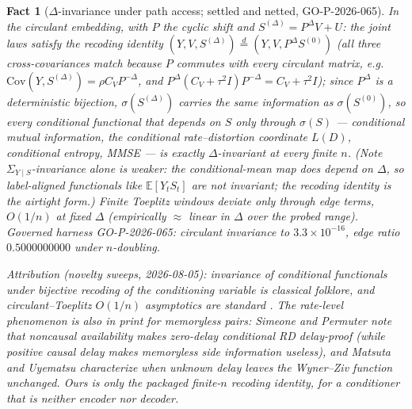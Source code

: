 ﻿\documentclass[11pt]{article}
\newtheorem{fact}{Fact}
\theoremstyle{remark}
\begin{document}
\begin{fact}[$\Delta$-invariance under path access; settled and netted,
GO-P-2026-065]\label{lem:recoding}
In the circulant embedding, with $P$ the cyclic shift and
$S^{(\Delta)}=P^\Delta V+U$: the joint laws satisfy the \emph{recoding
identity} $(Y,V,S^{(\Delta)})\overset d=(Y,V,P^\Delta S^{(0)})$
(all three cross-covariances match because $P$ commutes with every
circulant matrix, e.g.\ $\mathrm{Cov}(Y,S^{(\Delta)})=\rho C_VP^{-\Delta}$,
and $P^\Delta(C_V+\tau^2I)P^{-\Delta}=C_V+\tau^2I$); since $P^\Delta$ is
a deterministic bijection, $\sigma(S^{(\Delta)})$ carries the same
information as $\sigma(S^{(0)})$, so \emph{every conditional functional
that depends on $S$ only through $\sigma(S)$} --- conditional mutual
information, the conditional rate--distortion coordinate $L(D)$,
conditional entropy, MMSE --- is exactly $\Delta$-invariant at every
finite $n$. (Note $\Sigma_{Y\mid S}$-invariance alone is weaker: the
conditional-mean \emph{map} does depend on $\Delta$, so label-aligned
functionals like $\mathbb E[Y_tS_t]$ are not invariant; the recoding
identity is the airtight form.) Finite Toeplitz windows deviate only
through edge terms, $O(1/n)$ at fixed $\Delta$ (empirically $\approx$
linear in $\Delta$ over the probed range). Governed harness
GO-P-2026-065: circulant invariance to $3.3\times10^{-16}$, edge ratio
$0.5000000000$ under $n$-doubling.

\emph{Attribution} (novelty sweeps, 2026-08-05): invariance of
conditional functionals under bijective recoding of the conditioning
variable is classical folklore, and circulant--Toeplitz $O(1/n)$
asymptotics are standard \cite{grayToeplitz}. The rate-level
\emph{phenomenon} is also in print for memoryless pairs: Simeone and
Permuter \cite[Lemma~1]{simeonepermuter} note that noncausal
availability makes zero-delay conditional RD delay-proof (while
positive causal delay makes memoryless side information useless), and
Matsuta and Uyematsu \cite{matsuta} characterize when unknown delay
leaves the Wyner--Ziv function unchanged. Ours is only the packaged
finite-$n$ recoding identity, for a conditioner that is neither encoder
nor decoder.
\end{fact}
\end{document}
